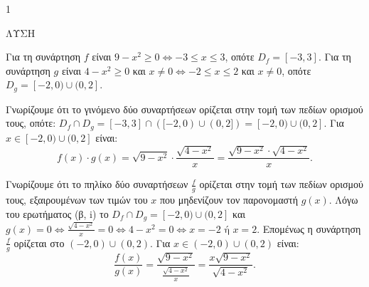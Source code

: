 \begin{ylh}{1}
    \item [Ύλη από εικόνα]
\end{ylh}
ΛΥΣΗ
\begin{alist}
    \item [α)] Για τη συνάρτηση $f$ είναι $9 - x^2 \ge 0 \Leftrightarrow -3 \le x \le 3$, οπότε $D_f = [-3,3]$.
    Για τη συνάρτηση $g$ είναι $4 - x^2 \ge 0$ και $x \ne 0 \Leftrightarrow -2 \le x \le 2$ και $x \ne 0$, οπότε $D_g = [-2,0) \cup (0,2]$.
    \item [β)]
    \begin{rlist}
        \item Γνωρίζουμε ότι το γινόμενο δύο συναρτήσεων ορίζεται στην τομή των πεδίων ορισμού τους, οπότε: $D_f \cap D_g = [-3,3] \cap ([-2,0) \cup (0,2]) = [-2,0) \cup (0,2]$.
        Για $x \in [-2,0) \cup (0,2]$ είναι:
        \[ f(x) \cdot g(x) = \sqrt{9-x^2} \cdot \frac{\sqrt{4-x^2}}{x} = \frac{\sqrt{9-x^2} \cdot \sqrt{4-x^2}}{x}. \]
        \item Γνωρίζουμε ότι το πηλίκο δύο συναρτήσεων $\frac{f}{g}$ ορίζεται στην τομή των πεδίων ορισμού τους, εξαιρουμένων των τιμών του $x$ που μηδενίζουν τον παρονομαστή $g(x)$. Λόγω του ερωτήματος (β, i) το $D_f \cap D_g = [-2,0) \cup (0,2]$ και $g(x) = 0 \Leftrightarrow \frac{\sqrt{4-x^2}}{x} = 0 \Leftrightarrow 4-x^2 = 0 \Leftrightarrow x=-2 \text{ ή } x=2$.
        Επομένως η συνάρτηση $\frac{f}{g}$ ορίζεται στο $(-2,0) \cup (0,2)$.
        Για $x \in (-2,0) \cup (0,2)$ είναι:
        \[ \frac{f(x)}{g(x)} = \frac{\sqrt{9-x^2}}{\frac{\sqrt{4-x^2}}{x}} = \frac{x\sqrt{9-x^2}}{\sqrt{4-x^2}}. \]
    \end{rlist}
\end{alist}